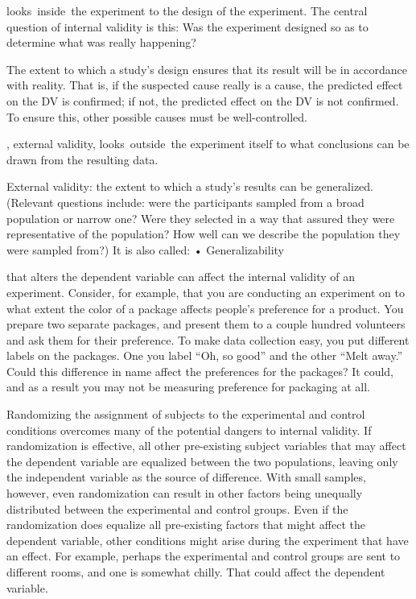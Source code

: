 \begin{refsection}
 looks inside the experiment to the design of the experiment. The central question of internal validity is this: Was the experiment designed so as to determine what was really happening?
\begin{thesis}
The extent to which a study's design ensures that its result will be in accordance with reality. That is, if the suspected cause really is a cause, the predicted effect on the DV is confirmed; if not, the predicted effect on the DV is not confirmed. To ensure this, other possible causes must be well-controlled.
\end{thesis}
, external validity, looks outside the experiment itself to what conclusions can be drawn from the resulting data.
\begin{thesis}
External validity: the extent to which a study's results can be generalized. (Relevant questions include: were the participants sampled from a broad population or narrow one? Were they selected in a way that assured they were representative of the population? How well can we describe the population they were sampled from?)
It is also called:
 • Generalizability

\end{thesis}

 that alters the dependent variable can affect the internal validity of an experiment. Consider, for example, that you are conducting an experiment on to what extent the color of a package affects people's preference for a product. You prepare two separate packages, and present them to a couple hundred volunteers and ask them for their preference. To make data collection easy, you put different labels on the packages. One you label ``Oh, so good'' and the other ``Melt away.'' Could this difference in name affect the preferences for the packages? It could, and as a result you may not be measuring preference for packaging at all.

Randomizing the assignment of subjects to the experimental and control conditions overcomes many of the potential dangers to internal validity. If randomization is effective, all other pre-existing subject variables that may affect the dependent variable are equalized between the two populations, leaving only the independent variable as the source of difference. With small samples, however, even randomization can result in other factors being unequally distributed between the experimental and control groups. Even if the randomization does equalize all pre-existing factors that might affect the dependent variable, other conditions might arise during the experiment that have an effect. For example, perhaps the experimental and control groups are sent to different rooms, and one is somewhat chilly. That could affect the dependent variable.


\end{refsection}
